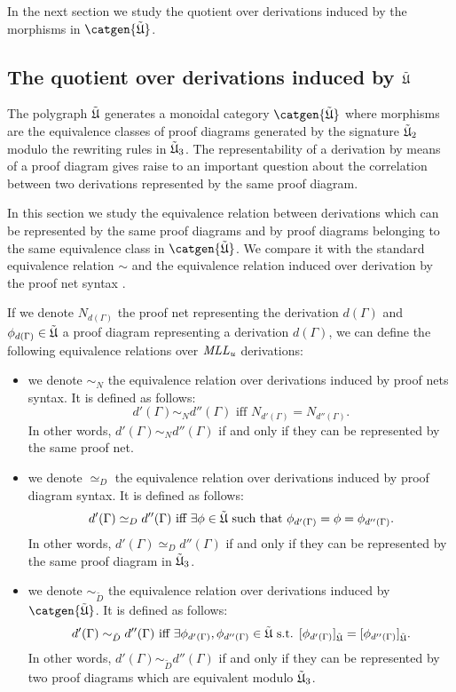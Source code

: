 \documentclass[a4paper]{article}
\begin{document}
In the next section we study the quotient over derivations  induced by the morphisms in $\catgen{\Mlltc}$.



\subsection{The quotient over derivations induced by ${\tilde{\mathfrak{U}}}$}\label{secQ}

The polygraph ${\tilde{\mathfrak{U}}}$ generates a monoidal category $\catgen{ \Mlltc}$ where morphisms are the equivalence classes of proof diagrams generated by the signature ${\tilde{\mathfrak{U}}}_2$ modulo the rewriting rules in ${\tilde{\mathfrak{U}}}_3$. The representability of a derivation by means of a proof diagram gives raise to  an important question about the correlation between two derivations represented by the same proof diagram.

In this section we study the equivalence relation between derivations which can be represented by the same proof diagrams and by proof diagrams belonging to the same equivalence class in $\catgen{ \Mlltc }$. We compare it with the standard equivalence relation $\sim$ and the equivalence relation induced over derivation by the proof net syntax \cite{MLLu}.

If we denote $N_{d(\Gamma)}$ the proof net representing the derivation $d(\Gamma)$ and  $\phi_{d(\Gamma)}\in {\tilde{\mathfrak{U}}}$ a proof diagram representing a derivation $d(\Gamma)$, we can define the following equivalence relations over $\mathit{MLL_u}$ derivations:
\begin{itemize}



\item we denote $\sim_N$ the equivalence relation over derivations induced by proof nets syntax. It is defined as follows:
$$d'(\Gamma)\sim_N d''(\Gamma) \mbox{ iff } N_{d'(\Gamma)}=N_{d''(\Gamma)}.$$
In other words, $d'(\Gamma)\sim_N d''(\Gamma)$ if and only if they can be represented by the same proof net.


\item we denote $\simeq_{D}$ the equivalence relation over derivations induced by proof diagram syntax. It is defined as follows:
$$d'(\Gamma)\simeq_{ D} d''(\Gamma) \mbox{ iff } \exists \phi \in {\tilde{\mathfrak{U}}} \mbox{ such that }\phi_{d'(\Gamma)}=\phi=\phi_{d''(\Gamma)}.$$
In other words, $d'(\Gamma)\simeq_{ D} d''(\Gamma)$ if and only if they can be represented by the same proof diagram in  ${\tilde{\mathfrak{U}}}_3$.


\item we denote $\sim_{\tilde D}$ the equivalence relation over derivations induced by $\catgen {\Mlltc}$. It is defined as follows:
$$d'(\Gamma)\sim_{\tilde D} d''(\Gamma) \mbox{ iff } \exists \phi_{d'(\Gamma)},\phi_{d''(\Gamma)}\in {\tilde{\mathfrak{U}}} \mbox{ s.t.  } [\phi_{d'(\Gamma)}]_{{\tilde{\mathfrak{U}}}}=[\phi_{d''(\Gamma)}]_{{\tilde{\mathfrak{U}}}}.$$
In other words, $d'(\Gamma)\sim_{\tilde D} d''(\Gamma)$ if and only if they can be represented by two proof diagrams which are equivalent modulo ${\tilde{\mathfrak{U}}}_3$. 
\end{itemize}
\end{document}
